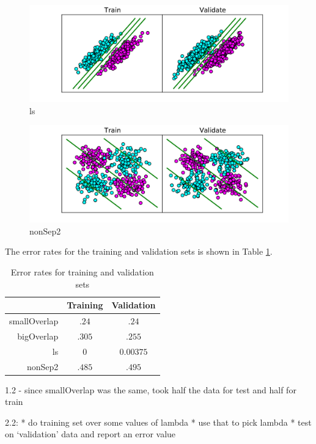 \documentclass[10pt]{article}
\begin{document}
\begin{figure}[!ht]
	\centering
	\includegraphics[width=\textwidth]{1-2-ls.pdf}
	\caption{ls}
	\label{fig:1-2-ls}
\end{figure}

\begin{figure}[!ht]
	\centering
	\includegraphics[width=\textwidth]{1-2-nonSep2.pdf}
	\caption{nonSep2}
	\label{fig:1-2-nonSep2}
\end{figure}

The error rates for the training and validation sets is shown in Table \ref{tbl:1-2-error}.

\begin{table}
\centering
\begin{tabular}{r|c|c}
	& Training & Validation \\ \hline
	smallOverlap & $.24$ & $.24$ \\
	bigOverlap & $.305$ & $.255$ \\
	ls & $0$ & $0.00375$ \\
	nonSep2 & $.485$ & $.495$ 
\end{tabular}
\caption{Error rates for training and validation sets}
\label{tbl:1-2-error}
\end{table}

1.2 - since smallOverlap was the same, took half the data for test and half for train



2.2: 
* do training set over some values of lambda
* use that to pick lambda
* test on `validation' data and report an error value
\end{document}

